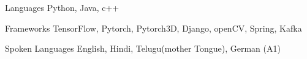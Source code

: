 
\begin{cvskills}
  \cvskill
    {Languages} %
    {Python, Java, c++} %

  \cvskill
    {Frameworks} %
    {TensorFlow, Pytorch, Pytorch3D, Django, openCV, Spring, Kafka} %
    
	\cvskill
	{Spoken Languages} %
	{English, Hindi, Telugu(mother Tongue), German (A1)} %
\end{cvskills}
